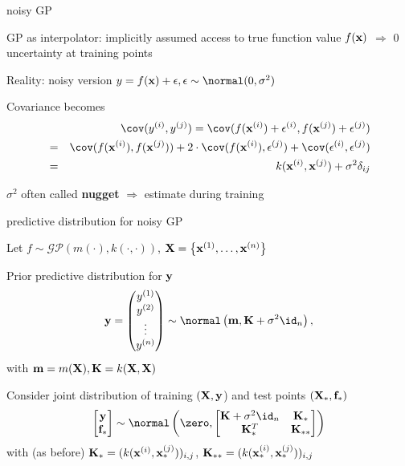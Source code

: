\documentclass[11pt,compress,t,notes=noshow, xcolor=table]{beamer}
\begin{document}
\begin{framei}[sep=L]{noisy GP}
\item GP as interpolator: implicitly assumed access to true function value $\fx$ $\Rightarrow$ 0 uncertainty at training points
\item Reality: noisy version
$y = \fx + \eps, \eps \sim\normal(0, \sigma^2)$
\item Covariance becomes 
\begin{eqnarray*} 
&& \cov(y^{(i)}, y^{(j)}) =  \cov (f(\xi) + \epsilon^{(i)}, f(\xi[j]) + \epsilon^{(j)}) \\
&=& \cov(f(\xi), f(\xi[j])) + 2 \cdot \cov(f(\xi), \epsilon^{(j)}) + \cov(\epsilon^{(i)}, \epsilon^{(j)}) 
\\ &=& k(\xi, \xi[j]) + \sigma^2 \delta_{ij}
\end{eqnarray*}
\item $\sigma^2$ often called \textbf{nugget} $\Rightarrow$ estimate during training
\end{framei}

\begin{framei}[sep=L]{predictive distribution for noisy GP}
\item Let $f \sim \mathcal{GP}(m(\cdot), k(\cdot, \cdot))$, $\Xmat = \xdat$
\item Prior predictive distribution for $\yv$
$$
\yv = \begin{pmatrix} \yi[1] \\ \yi[2] \\ \vdots \\ \yi[n] \end{pmatrix} \sim \normal\left(\mv, \Kmat + \sigma^2 \id_n \right),
$$
with $\mv = m(\Xmat), \Kmat = k(\Xmat, \Xmat)$
\item Consider joint distribution of training $(\Xmat, \yv$) and test points $(\Xmat_*, \fv_*)$
$$
\begin{bmatrix} \yv \\ \fv_* \end{bmatrix} \sim  
\normal\left(\zero, \begin{bmatrix} \Kmat + \sigma^2 \id_n & \Kmat_* \\ \Kmat_*^T & \Kmat_{**} \end{bmatrix}\right)
$$
with (as before) $\Kmat_* = (k(\xi, \xv_*^{(j)}))_{i,j}$, $\Kmat_{**} = (k(\xi[i]_*, \xi[j]_*))_{i,j}$
\end{framei}
\end{document}
